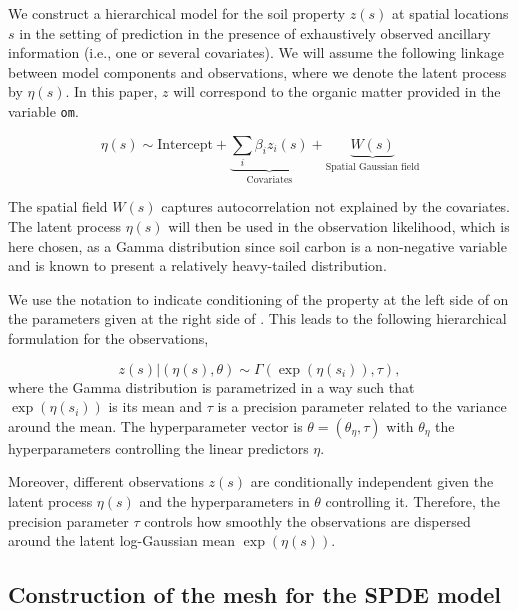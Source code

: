 \documentclass[
  a4paper,
]{article}
\begin{document}
We construct a hierarchical model for the soil property \(z(s)\) at
spatial locations \(s\) in the setting of prediction in the presence of
exhaustively observed ancillary information (i.e., one or several
covariates). We will assume the following linkage between model
components and observations, where we denote the latent process by
\(\eta(s)\). In this paper, \(z\) will correspond to the organic matter
provided in the variable \texttt{om}.

\[
\eta(s) \sim {\text{Intercept}} + \underbrace{ \sum_{i}\beta_i z_i(s)}_{\text{Covariates} } +\underbrace{W(s)}_{\text{Spatial Gaussian field}}
\]

The spatial field \(W(s)\) captures autocorrelation not explained by the
covariates. The latent process \(\eta(s)\) will then be used in the
observation likelihood, which is here chosen, as a Gamma distribution
since soil carbon is a non-negative variable and is known to present a
relatively heavy-tailed distribution.

We use the \texttt{\textbar{}} notation to indicate conditioning of the
property at the left side of \texttt{\textbar{}} on the parameters given
at the right side of \texttt{\textbar{}}. This leads to the following
hierarchical formulation for the observations,

\[
z(s) | (\eta(s),\theta) \sim \Gamma(\exp(\eta(s_i)), \tau),
\] where the Gamma distribution is parametrized in a way such that
\(\exp(\eta(s_i))\) is its mean and \(\tau\) is a precision parameter
related to the variance around the mean. The hyperparameter vector is
\(\theta = (\theta_\eta, \tau)\) with \(\theta_\eta\) the
hyperparameters controlling the linear predictors \(\eta\).

Moreover, different observations \(z(s)\) are conditionally independent
given the latent process \(\eta(s)\) and the hyperparameters in
\(\theta\) controlling it. Therefore, the precision parameter \(\tau\)
controls how smoothly the observations are dispersed around the latent
log-Gaussian mean \(\exp(\eta(s))\).

\hypertarget{construction-of-the-mesh-for-the-spde-model}{%
\subsection{Construction of the mesh for the SPDE
model}\label{construction-of-the-mesh-for-the-spde-model}}
\end{document}
